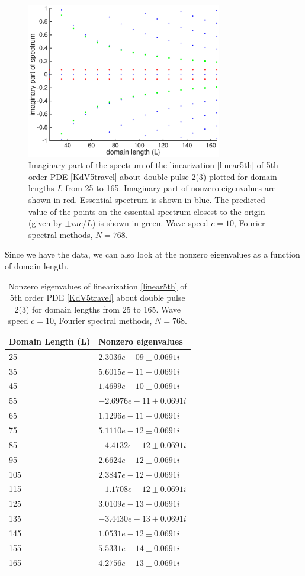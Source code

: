 \documentclass[12pt]{article}
\begin{document}
\begin{figure}[H]\label{essspecL}
	\includegraphics[width=8.5cm]{essspecL}
	\caption{Imaginary part of the spectrum of the linearization \eqref{linear5th} of 5th order PDE \eqref{KdV5travel} about double pulse 2(3) plotted for domain lengths $L$ from 25 to 165. Imaginary part of nonzero eigenvalues are shown in red. Essential spectrum is shown in blue. The predicted value of the points on the essential spectrum closest to the origin (given by $\pm i \pi c/L$) is shown in green. Wave speed $c = 10$, Fourier spectral methods, $N = 768$.}
	\label{essspecL}
\end{figure}

Since we have the data, we can also look at the nonzero eigenvalues as a function of domain length.

\begin{table}[H]
\begin{tabular}{l|l}
Domain Length (L)  & Nonzero eigenvalues \\ \hline
    25 &  $  2.3036e-09 \pm 0.0691i$   \\
    35 &  $  5.6015e-11 \pm 0.0691i$   \\
    45 &  $  1.4699e-10 \pm 0.0691i$   \\
    55 &  $ -2.6976e-11 \pm 0.0691i$   \\
    65 &  $  1.1296e-11 \pm 0.0691i$   \\
    75 &  $  5.1110e-12 \pm 0.0691i$   \\
    85 &  $ -4.4132e-12 \pm 0.0691i$   \\
    95 &  $  2.6624e-12 \pm 0.0691i$   \\
   105 &  $  2.3847e-12 \pm 0.0691i$   \\
   115 &  $ -1.1708e-12 \pm 0.0691i$   \\
   125 &  $  3.0109e-13 \pm 0.0691i$   \\
   135 &  $ -3.4430e-13 \pm 0.0691i$   \\
   145 &  $  1.0531e-12 \pm 0.0691i$   \\
   155 &  $  5.5331e-14 \pm 0.0691i$   \\
   165 &  $  4.2756e-13 \pm 0.0691i$   \\
\end{tabular}
\caption{Nonzero eigenvalues of linearization \eqref{linear5th} of 5th order PDE \eqref{KdV5travel} about double pulse 2(3) for domain lengths from 25 to 165. Wave speed $c = 10$, Fourier spectral methods, $N = 768$.}
\label{eigvsL}
\end{table}
\end{document}
